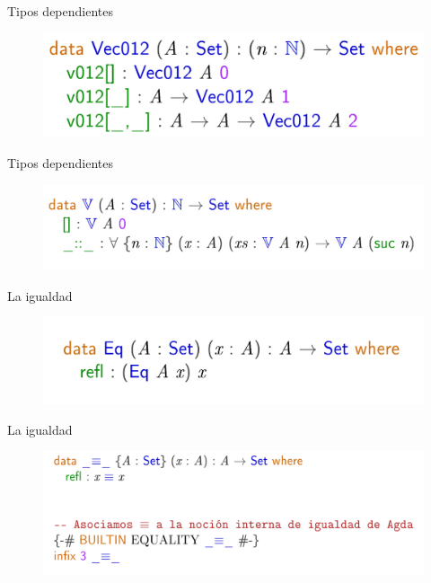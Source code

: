 \documentclass[11pt]{beamer}
\begin{document}
\begin{frame}{Tipos dependientes}
\begin{figure}
\includegraphics[scale=0.4]{img/vec012}
\end{figure}
\end{frame}



\begin{frame}{Tipos dependientes}
\begin{figure}
\includegraphics[scale=0.4]{img/vec}
\end{figure}
\end{frame}



\begin{frame}{La igualdad}
\begin{figure}
\includegraphics[scale=0.5]{img/eq}
\end{figure}
\end{frame}

\begin{frame}{La igualdad}
\begin{figure}
\includegraphics[scale=0.4]{img/equality}
\end{figure}
\end{frame}
\end{document}
